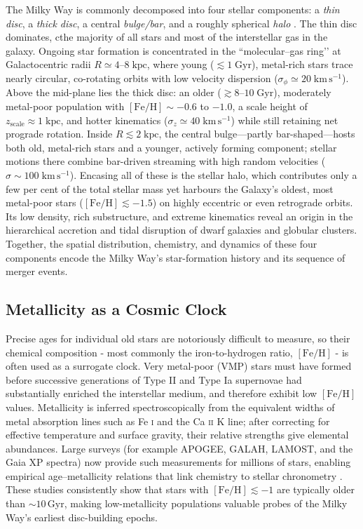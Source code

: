 \documentclass[a4paper,12pt]{article}
\begin{document}
The Milky Way is commonly decomposed into four stellar components: a \emph{thin disc}, a \emph{thick disc}, a central \emph{bulge/bar}, and a roughly spherical \emph{halo} \citep{BlandHawthorn2016,Helmi2020}.  
The thin disc dominates, cthe majority of all stars and most of the interstellar gas in the galaxy.  Ongoing star formation is concentrated in the “molecular–gas ring’’ at Galactocentric radii $R\simeq4$–$8\;\mathrm{kpc}$, where young ($\lesssim1\;\mathrm{Gyr}$), metal-rich stars trace nearly circular, co-rotating orbits with low velocity dispersion ($\sigma_\phi \simeq 20\;\mathrm{km\,s^{-1}}$).  
Above the mid-plane lies the thick disc: an older ($\gtrsim8$–$10\;\mathrm{Gyr}$), moderately metal-poor population with $[\mathrm{Fe/H}]\sim-0.6$ to $-1.0$, a scale height of $z_{\mathrm{scale}}\approx1\;\mathrm{kpc}$, and hotter kinematics ($\sigma_z \simeq 40\;\mathrm{km\,s^{-1}}$) while still retaining net prograde rotation.  
Inside $R\lesssim2\;\mathrm{kpc}$, the central bulge—partly bar-shaped—hosts both old, metal-rich stars and a younger, actively forming component; stellar motions there combine bar-driven streaming with high random velocities ($\sigma\sim100\;\mathrm{km\,s^{-1}}$).  
Encasing all of these is the stellar halo, which contributes only a few per cent of the total stellar mass yet harbours the Galaxy’s oldest, most metal-poor stars ($[\mathrm{Fe/H}]\lesssim-1.5$) on highly eccentric or even retrograde orbits.  
Its low density, rich substructure, and extreme kinematics reveal an origin in the hierarchical accretion and tidal disruption of dwarf galaxies and globular clusters.  
Together, the spatial distribution, chemistry, and dynamics of these four components encode the Milky Way’s star-formation history and its sequence of merger events.


\subsection{Metallicity as a Cosmic Clock}

Precise ages for individual old stars are notoriously difficult to measure, so their chemical composition - most commonly the iron-to-hydrogen ratio, $[\mathrm{Fe/H}]$ - is often used as a surrogate clock.  
Very metal-poor (VMP) stars must have formed before successive generations of Type II and Type Ia supernovae had substantially enriched the interstellar medium, and therefore exhibit low $[\mathrm{Fe/H}]$ values.  
Metallicity is inferred spectroscopically from the equivalent widths of metal absorption lines such as Fe \textsc{i} and the Ca \textsc{ii} K line; after correcting for effective temperature and surface gravity, their relative strengths give elemental abundances.
Large surveys (for example APOGEE, GALAH, LAMOST, and the Gaia XP spectra) now provide such measurements for millions of stars, enabling empirical age–metallicity relations that link chemistry to stellar chronometry \citep[e.g.][]{Nordstrom2004,Haywood2013,leung2019deep,Anders2023}.  
These studies consistently show that stars with $[\mathrm{Fe/H}]\lesssim -1$ are typically older than $\sim10$\,Gyr, making low-metallicity populations valuable probes of the Milky Way’s earliest disc-building epochs.
\end{document}
